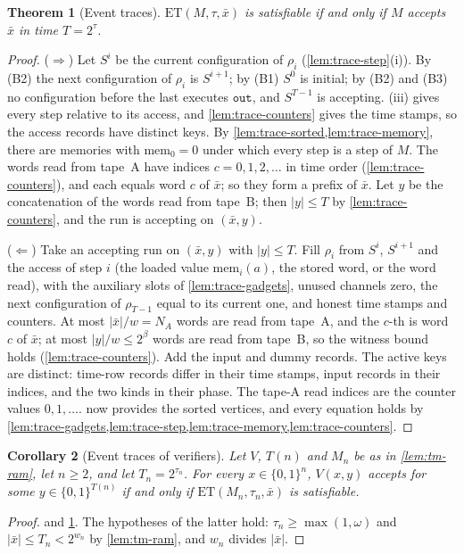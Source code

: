 \documentclass[11pt,letterpaper]{article}
\newtheorem{theorem}{Theorem}[section]
\newtheorem{corollary}[theorem]{Corollary}
\theoremstyle{definition}
\theoremstyle{remark}
\newcommand{\abs}[1]{\left|#1\right|}
\begin{document}
\begin{theorem}[Event traces]\label{thm:trace}
\(\mathrm{ET}(M,\tau,\bar x)\) is satisfiable if and only if \(M\)
accepts \(\bar x\) in time \(T=2^\tau\).
\end{theorem}
\begin{proof}
(\(\Rightarrow\)) Let \(S^i\) be the current configuration of \(\rho_i\)
(\cref{lem:trace-step}(i)). By (B2) the next configuration of \(\rho_i\)
is \(S^{i+1}\); by (B1) \(S^0\) is initial; by (B2) and (B3) no
configuration before the last executes \(\mathtt{out}\), and
\(S^{T-1}\) is accepting. (iii) gives every step
relative to its access, and \cref{lem:trace-counters} gives the time
stamps, so the access records have distinct keys. By
\cref{lem:trace-sorted,lem:trace-memory}, there are memories with
\(\mathrm{mem}_0=0\) under which every step is a step of \(M\). The
words read from tape~A have indices \(c=0,1,2,\ldots\) in time order
(\cref{lem:trace-counters}), and each equals word \(c\) of \(\bar x\);
so they form a prefix of \(\bar x\). Let \(y\) be the concatenation of
the words read from tape~B; then \(\abs y\le T\) by
\cref{lem:trace-counters}, and the run is accepting on \((\bar x,y)\).

(\(\Leftarrow\)) Take an accepting run on \((\bar x,y)\) with
\(\abs y\le T\). Fill \(\rho_i\) from \(S^i\), \(S^{i+1}\) and the
access of step \(i\) (the loaded value \(\mathrm{mem}_i(a)\), the stored
word, or the word read), with the auxiliary slots of
\cref{lem:trace-gadgets}, unused channels zero, the next configuration of \(\rho_{T-1}\) equal
to its current one, and honest time stamps and counters. At most \(\abs{\bar x}/w=N_A\) words
are read from tape~A, and the \(c\)-th is word \(c\) of \(\bar x\); at
most \(\abs y/w\le2^\beta\) words are read from tape~B, so the witness
bound holds (\cref{lem:trace-counters}). Add the input and dummy
records. The active keys are distinct: time-row records differ in their
time stamps, input records in their indices, and the two kinds in their
phase. The tape-A read indices are the counter values
\(0,1,\ldots\).  now provides the sorted
vertices, and every equation holds by
\cref{lem:trace-gadgets,lem:trace-step,lem:trace-memory,lem:trace-counters}.
\end{proof}

\begin{corollary}[Event traces of verifiers]\label{cor:trace-verifier}
Let \(V\), \(T(n)\) and \(M_n\) be as in \cref{lem:tm-ram}, let
\(n\ge2\), and let \(T_n=2^{\tau_n}\). For every \(x\in\{0,1\}^n\),
\(V(x,y)\) accepts for some \(y\in\{0,1\}^{T(n)}\) if and only if
\(\mathrm{ET}(M_n,\tau_n,\bar x)\) is satisfiable.
\end{corollary}
\begin{proof}
 and \cref{thm:trace}. The hypotheses of the latter
hold: \(\tau_n\ge\max(1,\omega)\) and \(\abs{\bar x}\le T_n<2^{w_n}\) by
\cref{lem:tm-ram}, and \(w_n\) divides \(\abs{\bar x}\).
\end{proof}
\end{document}
